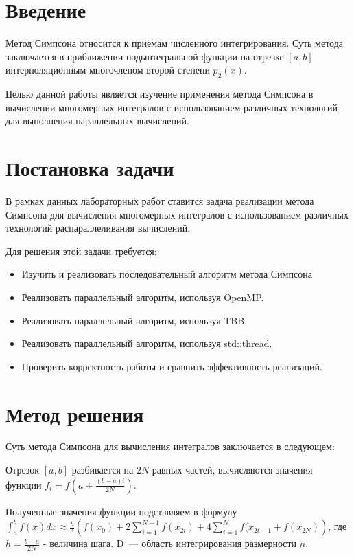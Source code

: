 \documentclass{report}
\begin{document}
\setcounter{page}{2}

\tableofcontents
\newpage

\section*{Введение}
Метод Симпсона относится к приемам численного интегрирования. Суть метода заключается в приближении подынтегральной функции на отрезке $[a,b]$ интерполяционным многочленом второй степени $p_2(x)$.
\par Целью данной работы является изучение применения метода Симпсона в вычислении многомерных интегралов с использованием различных технологий для выполнения параллельных вычислений.
\newpage

\section*{Постановка задачи}
В рамках данных лабораторных работ ставится задача реализации метода Симпсона для вычисления многомерных интегралов с использованием различных технологий распараллеливания вычислений.
\par Для решения этой задачи требуется:
\begin{itemize}
\item Изучить и реализовать последовательный алгоритм метода Симпсона
\item Реализовать параллельный алгоритм, используя OpenMP.
\item Реализовать параллельный алгоритм, используя TBB.
\item Реализовать параллельный алгоритм, используя std::thread.
\item Проверить корректность работы и сравнить эффективность реализаций.
\end{itemize}

\newpage

\section*{Метод решения}
Суть метода Симпсона для вычисления интегралов заключается в следующем:
\par Отрезок $[a,b]$ разбивается на $2N$ равных частей, вычисляются значения функции $f_i=f(a + \frac{(b-a)i}{2N})$.
\par Полученные значения функции подставляем в формулу $\int_{a}^{b}{f(x)dx} \approx \frac{h}{3}(f(x_{0}) + 2\sum_{i=1}^{N-1}{f(x_{2i})} + 4\sum_{i=1}^{N}{f(x_{2i-1}} + f(x_{2N}))$, где $h=\frac{b-a}{2N}$ - величина шага.
\indent D~--- область интегрирования размерности $n$.
\end{document}
